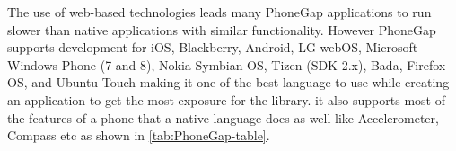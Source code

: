 The use of web-based technologies leads many PhoneGap applications
to run slower than native applications with similar functionality.
However PhoneGap supports development for iOS, Blackberry, Android,
LG webOS, Microsoft Windows Phone (7 and 8), Nokia Symbian OS, Tizen
(SDK 2.x), Bada, Firefox OS, and Ubuntu Touch making it one of the
best language to use while creating an application to get the most
exposure for the library. it also supports most of the features of
a phone that a native language does as well like Accelerometer, Compass
etc as shown in \ref{tab:PhoneGap-table}.

